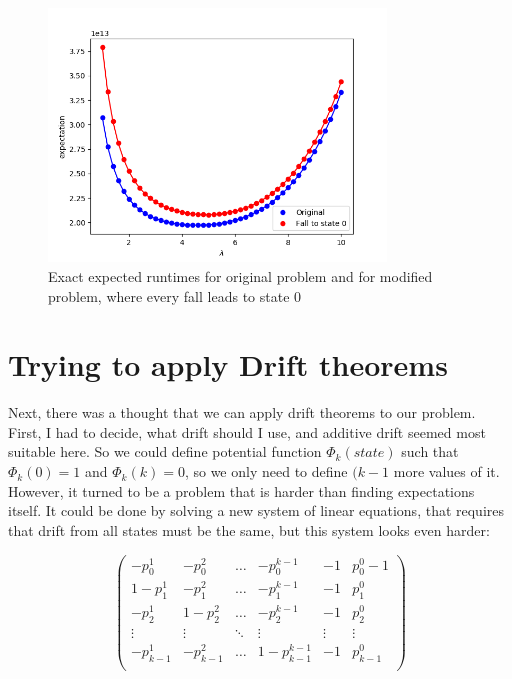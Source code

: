 \documentclass{article}
\begin{document}
\begin{figure}
 \label{doerr}
 \includegraphics[width=0.8\textwidth]{pic/doerr.png}
 \caption{Exact expected runtimes for original problem and for modified problem, where every fall leads to state $0$
 \label{doerr}}
\end{figure}


\section{Trying to apply Drift theorems}

Next, there was a thought that we can apply drift theorems to our problem. First, I had to decide, what drift should I use, and additive drift seemed most suitable here. So we could define potential function $\Phi_k(state)$ such that $\Phi_k(0)  = 1$ and $\Phi_k(k) = 0$, so we only need to define $(k - 1$ more values of it. However, it turned to be a problem that is harder than finding expectations itself. It could be done by solving a new system of linear equations, that requires that drift from all states must be the same, but this system looks even harder:

$$
 \left(
  \begin{array}{ccccc|c}
   - p_0^1 & -p_0^2 & \dots & -p_0^{k - 1} & -1 & p_0^0 - 1 \\
   1 -p_1^1 & - p_1^2 & \dots & -p_1^{k - 1} & -1 & p_1^0 \\
   -p_2^1 & 1 -p_2^2 & \dots & -p_2^{k - 1} & -1 & p_2^0 \\
   \vdots & \vdots & \ddots & \vdots & \vdots & \vdots \\
   -p_{k - 1}^1 & -p_{k - 1}^2 & \dots & 1 - p_{k - 1}^{k - 1} & -1 & p_{k - 1}^0 \\
  \end{array}
 \right)
$$
\end{document}
